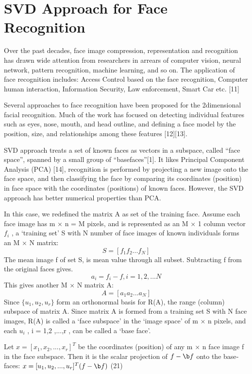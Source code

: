 \section{SVD Approach for Face Recognition} 
Over the past decades, face image compression,
representation and recognition has drawn wide 
attention from researchers in  arrears of
computer  vision, neural network, pattern 
recognition, machine  learning, and so on. The 
application of face recognition includes: 
Access Control based  on the  face recognition, Computer  ­human interaction, Information 
Security, Law enforcement, Smart Car etc. [11]\par
Several approaches to face  recognition have 
been proposed  for the  2­dimensional facial 
recognition. Much of the work has focused on 
detecting individual features such as eyes, nose, 
mouth, and  head  outline,  and  defining  a  face 
model by the  position, size,  and  relationships
among these features [12][13].
\par
SVD  approach treats a set  of known faces as
vectors in a  subspace,  called  “face  space”, spanned by a small group of “base­faces”[1]. It 
likes Principal Component Analysis (PCA) [14],
recognition is performed  by projecting  a  new 
image onto the face space, and then classifying 
the face by comparing its coordinates (position)
in face space with the coordinates (positions) of
known faces. However, the SVD approach has
better numerical properties than PCA.\par
In this case, we redefined the matrix A as set of
the training face. Assume  each face  image has
m × n = M pixels, and is represented as an M × 
1  column  vector $f_i$ , a  ‘training  set’ S with N
number  of face  images of known individuals
forms an M × N matrix: 
\[
S = [ f{_1} f{_2}...f{_N}]
\]
The mean image f of set S, is mean value through all subset.
Subtracting f from the original faces gives.
\[
a_i = f_i  - f,        i = 1, 2,... N
\]
This gives another M × N matrix A: 
\[
A = [ a{_1} a{_2}...a{_N}]
\]
Since $\{ u_1, u_2,  u_r\}$ form an orthonormal basis
for R(A), the range (column) subspace of matrix
A. Since matrix A is formed from a training set
S with N face  images, R(A) is called  a  ‘face 
subspace’ in the ‘image space’ of m × n pixels, and each $u_i$ , i = 1,2 ,...,r , can be called a ‘base­ 
face’.\par
Let $x =[x_1, x_2,..., x_r ]^T$ be  the  coordinates
(position) of any m × n face image f in the face 
subspace. Then it is the  scalar  projection of
$f - \b f$ onto the base­faces:
$x = [u_1, u_2,...,u_r]^T(f - \b f)$ (21)
